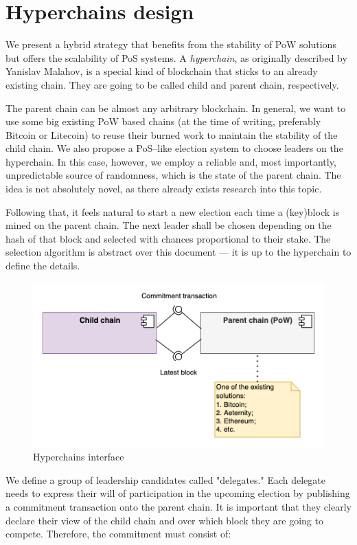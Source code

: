 \section{Hyperchains design}
\graphicspath{ {./images/} }

We present a hybrid strategy that benefits from the stability of PoW solutions
but offers the scalability of PoS systems. A \emph{hyperchain}, as originally
described by Yanislav Malahov\cite{hyperchains}, is a special kind of blockchain
that sticks to an already existing chain. They are going to be called child and
parent chain, respectively.

The parent chain can be almost any arbitrary blockchain. In general, we want to
use some big existing PoW based chains (at the time of writing, preferably
Bitcoin or Litecoin) to reuse their burned work to maintain the stability of the
child chain. We also propose a PoS–like election system to choose leaders on the
hyperchain. In this case, however, we employ a reliable and, most importantly,
unpredictable source of randomness, which is the state of the parent chain. The
idea is not absolutely novel, as there already exists research into this
topic\cite{blockchain_random}.

Following that, it feels natural to start a new election each time a (key)block
is mined on the parent chain. The next leader shall be chosen depending on the
hash of that block and selected with chances proportional to their stake. The
selection algorithm is abstract over this document --- it is up to the
hyperchain to define the details.

\begin{figure}[b]
     \caption{Hyperchains interface}
     \centering
     \includegraphics[scale=0.5]{hyperchains_interface}
\end{figure}

We define a group of leadership candidates called "delegates." Each delegate
needs to express their will of participation in the upcoming election by
publishing a commitment transaction onto the parent chain. It is important that
they clearly declare their view of the child chain and over which block they are
going to compete. Therefore, the commitment must consist of:

